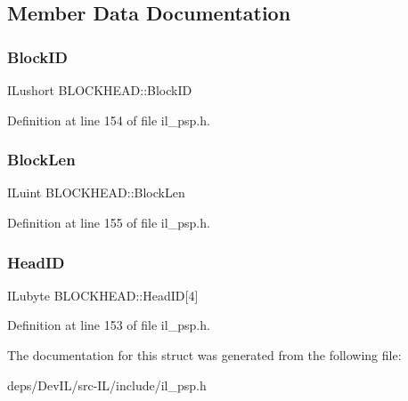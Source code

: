 \subsection{Member Data Documentation}
\mbox{\label{structBLOCKHEAD_ac04fea04ebbeb63a0fafa9d9bce8d238}} 
\subsubsection{\texorpdfstring{Block\+ID}{BlockID}}
{\footnotesize\ttfamily I\+Lushort B\+L\+O\+C\+K\+H\+E\+A\+D\+::\+Block\+ID}



Definition at line 154 of file il\+\_\+psp.\+h.

\mbox{\label{structBLOCKHEAD_a85119487a9a0a83b210b7bb6d1758d54}} 
\subsubsection{\texorpdfstring{Block\+Len}{BlockLen}}
{\footnotesize\ttfamily I\+Luint B\+L\+O\+C\+K\+H\+E\+A\+D\+::\+Block\+Len}



Definition at line 155 of file il\+\_\+psp.\+h.

\mbox{\label{structBLOCKHEAD_a04cdb591101a970ef537d080d8d51392}} 
\subsubsection{\texorpdfstring{Head\+ID}{HeadID}}
{\footnotesize\ttfamily I\+Lubyte B\+L\+O\+C\+K\+H\+E\+A\+D\+::\+Head\+ID\mbox{[}4\mbox{]}}



Definition at line 153 of file il\+\_\+psp.\+h.



The documentation for this struct was generated from the following file\+:\begin{DoxyCompactItemize}
\item 
deps/\+Dev\+I\+L/src-\/\+I\+L/include/il\+\_\+psp.\+h\end{DoxyCompactItemize}

